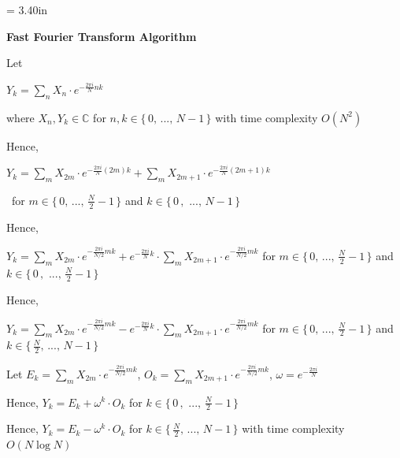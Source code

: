 \documentclass[a4paper,12pt]{article}
\begin{document}
\newpage\thispagestyle{empty}\pdfpageheight = 3.40in\enlargethispage{100in}

\textbf{Fast Fourier Transform Algorithm}

\bigskip

Let\begin{lalign}
    $Y_k = \sum_n X_n \cdot e^{-\frac{2\pi i}{N}nk}$
\end{lalign}
where $X_n, Y_k \in \mathbb{C}$ for $n, k \in \{\,0,\,...,\,N - 1\,\}$ with time complexity $O(N^2)$

\bigskip

Hence,\begin{lalign}
    $Y_k = \sum_m X_{2m} \cdot e^{-\frac{2\pi i}{N}(2m)k} + \sum_m X_{2m+1} \cdot e^{-\frac{2\pi i}{N}(2m+1)k}$
\end{lalign}
\,\,\,for $m \in \{\,0,\,...,\,\frac{N}{2} - 1\,\}$ and $k \in \{\,0\,,\,\,...,\,N - 1\,\}$

\bigskip

Hence,\begin{lalign}
    $Y_k = {\sum_m X_{2m} \cdot e^{-\frac{2\pi i}{N/2} mk}} + e^{-\frac{2\pi i}{N}k} \cdot \sum_m X_{2m+1} \cdot e^{-\frac{2\pi i}{N/2} mk}$ for $m \in \{\,0,\,...,\,\frac{N}{2} - 1\,\}$ and $k \in \{\,0\,,\,\,...,\,\frac{N}{2} - 1\,\}$
\end{lalign}

\bigskip

Hence,\begin{lalign}
    $Y_k = \sum_m X_{2m} \cdot e^{-\frac{2\pi i}{N/2}mk} - e^{-\frac{2\pi i}{N}k} \cdot \sum_m X_{2m+1} \cdot e^{-\frac{2\pi i}{N/2} mk}$ for $m \in \{\,0,\,...,\,\frac{N}{2} - 1\,\}$ and $k \in \{\,\frac{N}{2},\,...,\,N - 1\,\}$
\end{lalign}

\bigskip

Let $E_k = \sum_m X_{2m} \cdot e^{-\frac{2\pi i}{N/2}mk}$, $O_k = \sum_m X_{2m+1} \cdot e^{-\frac{2\pi i}{N/2} mk}$, $\omega = e^{-\frac{2\pi i}{N}}$

\bigskip

Hence, $Y_k = E_k + \omega^k \cdot O_k$ for $k \in \{\,0\,,\,\,...,\,\frac{N}{2} - 1\,\}$

\bigskip

Hence, $Y_k = E_k - \omega^k \cdot O_k$ for $k \in \{\,\frac{N}{2},\,...,\,N - 1\,\}$ with time complexity $O(N \log N)$
\end{document}
